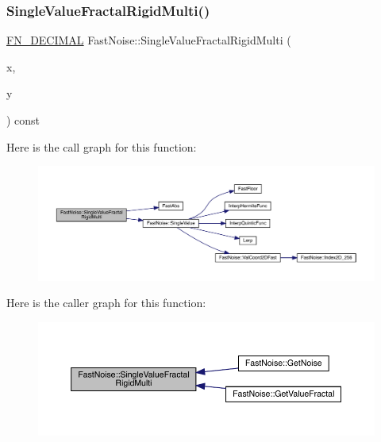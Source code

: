 \subsubsection{\texorpdfstring{Single\+Value\+Fractal\+Rigid\+Multi()}{SingleValueFractalRigidMulti()}\hspace{0.1cm}{\footnotesize\ttfamily [1/2]}}
{\footnotesize\ttfamily \mbox{\hyperlink{_fast_noise_8h_a75a9ef6d2541c4921815b885bfd449c3}{F\+N\+\_\+\+D\+E\+C\+I\+M\+AL}} Fast\+Noise\+::\+Single\+Value\+Fractal\+Rigid\+Multi (\begin{DoxyParamCaption}\item[{\mbox{\hyperlink{_fast_noise_8h_a75a9ef6d2541c4921815b885bfd449c3}{F\+N\+\_\+\+D\+E\+C\+I\+M\+AL}}}]{x,  }\item[{\mbox{\hyperlink{_fast_noise_8h_a75a9ef6d2541c4921815b885bfd449c3}{F\+N\+\_\+\+D\+E\+C\+I\+M\+AL}}}]{y }\end{DoxyParamCaption}) const\hspace{0.3cm}{\ttfamily [private]}}

Here is the call graph for this function\+:
\nopagebreak
\begin{figure}[H]
\begin{center}
\leavevmode
\includegraphics[width=350pt]{class_fast_noise_a9061e8fb70914a8aa976d861d21a4f63_cgraph}
\end{center}
\end{figure}
Here is the caller graph for this function\+:
\nopagebreak
\begin{figure}[H]
\begin{center}
\leavevmode
\includegraphics[width=350pt]{class_fast_noise_a9061e8fb70914a8aa976d861d21a4f63_icgraph}
\end{center}
\end{figure}
\mbox{\label{class_fast_noise_a252117bcf7130247e06fa0bd1695c41e}} 
